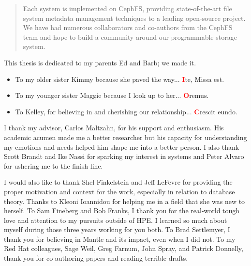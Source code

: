 \begin{frontmatter}
\begin{abstract}
Each system is implemented on CephFS, providing state-of-the-art file system
metadata management techniques to a leading open-source project. We have had
numerous collaborators and co-authors from the CephFS team and hope to build a
community around our programmable storage system.

	\end{abstract}
	\begin{dedication}
                \vspace*{\fill}
                \noindent This thesis is dedicated to my parents Ed and Barb; we made it.
                \begin{itemize}
                  \item[] To my older sister Kimmy because she paved the way...  {\huge\textbf{\textcolor{red}{I}}}te, Missa est.
                  \item[] To my younger sister Maggie because I look up to her...  {\huge\textbf{\textcolor{red}{O}}}remus.
                  \item[] To Kelley, for believing in and cherishing our  relationship... {\huge\textbf{\textcolor{red}{C}}}rescit eundo.
                \end{itemize}
                \vspace*{\fill}
	\end{dedication}
	\begin{acknowledgements}

I thank my advisor, Carlos Maltzahn, for his support and enthusiasm. His
academic acumen made me a better researcher but his capacity for understanding
my emotions and needs helped him shape me into a better person. I also thank
Scott Brandt and Ike Nassi for sparking my interest in systems and Peter Alvaro
for ushering me to the finish line.

I would also like to thank Shel Finkelstein and Jeff LeFevre for providing the
proper motivation and context for the work, especially in relation to database
theory. Thanks to Kleoni Ioannidou for helping me in a field that she was new
to herself. To Sam Fineberg and Bob Franks, I thank you for the real-world
tough love and attention to my pursuits outside of HPE.  I learned so much
about myself during those three years working for you both. To Brad Settlemyer,
I thank you for believing in Mantle and its impact, even when I did not.  To my
Red Hat colleagues, Sage Weil, Greg Farnum, John Spray, and Patrick Donnelly,
thank you for co-authoring papers and reading terrible drafts. 


\end{acknowledgements}
\end{frontmatter}
